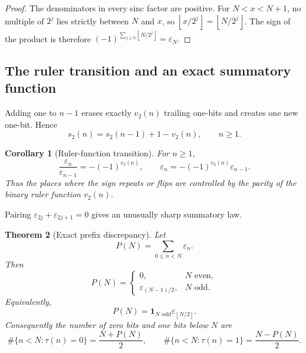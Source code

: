\documentclass[11pt,oneside]{article}
\newtheorem{theorem}{Theorem}[section]
\newtheorem{corollary}[theorem]{Corollary}
\theoremstyle{definition}
\theoremstyle{remark}
\newcommand{\vtwo}{v_2}
\newcommand{\bitsum}{s_2}
\newcommand{\eps}{\varepsilon}
\newcommand{\ind}{\mathbf 1}
\newcommand{\floor}[1]{\left\lfloor #1\right\rfloor}
\begin{document}
\begin{proof}
The denominators in every sinc factor are positive.  For \(N<x<N+1\), no
multiple of \(2^j\) lies strictly between \(N\) and \(x\), so
\(\floor{x/2^j}=\floor{N/2^j}\).  The sign of the product is therefore
\((-1)^{\sum_{j\ge0}\floor{N/2^j}}=\eps_N\).
\end{proof}

\subsection{The ruler transition and an exact summatory function}

Adding one to \(n-1\) erases exactly \(\vtwo(n)\) trailing one-bits and creates
one new one-bit.  Hence
\begin{equation}
  \bitsum(n)=\bitsum(n-1)+1-\vtwo(n),\qquad n\ge1.
  \label{eq:digit-transition}
\end{equation}

\begin{corollary}[Ruler-function transition]
For \(n\ge1\),
\begin{equation}
  \frac{\eps_n}{\eps_{n-1}}
   =-(-1)^{\vtwo(n)},
  \qquad
  \eps_n=-(-1)^{\vtwo(n)}\eps_{n-1}.
  \label{eq:ruler-transition}
\end{equation}
Thus the places where the sign repeats or flips are controlled by the parity
of the binary ruler function \(\vtwo(n)\).
\end{corollary}

Pairing \(\eps_{2j}+\eps_{2j+1}=0\) gives an unusually sharp summatory law.

\begin{theorem}[Exact prefix discrepancy]
Let
\[
  P(N)=\sum_{0\le n<N}\eps_n.
\]
Then
\begin{equation}
  P(N)=
  \begin{cases}
    0,&N\text{ even},\\
    \eps_{(N-1)/2},&N\text{ odd}.
  \end{cases}
  \label{eq:prefix-discrepancy}
\end{equation}
Equivalently,
\begin{equation}
  P(N)=\ind_{N\text{ odd}}\eps_{\floor{N/2}}.
  \label{eq:prefix-indicator}
\end{equation}
Consequently the number of zero bits and one bits below \(N\) are
\begin{equation}
  \#\{n<N:\tau(n)=0\}=\frac{N+P(N)}2,
  \qquad
  \#\{n<N:\tau(n)=1\}=\frac{N-P(N)}2.
  \label{eq:bit-count-prefix}
\end{equation}
\end{theorem}
\end{document}
